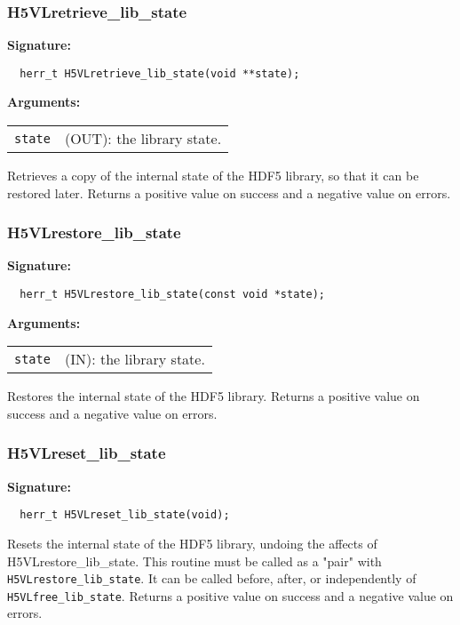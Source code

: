 \subsubsection{H5VLretrieve\_lib\_state}
\begin{mdframed}[style=bgbox]
\textbf{Signature:}
\begin{lstlisting}
  herr_t H5VLretrieve_lib_state(void **state);
\end{lstlisting}
\textbf{Arguments:}\\
\begin{tabular}{l p{13.5cm}}
 {\tt state} & (OUT): the library state.\\
\end{tabular}
\end{mdframed}
Retrieves a copy of the internal state of the HDF5 library,
so that it can be restored later.
Returns a positive value on success and a negative value on errors.
\bigskip


\subsubsection{H5VLrestore\_lib\_state}
\begin{mdframed}[style=bgbox]
\textbf{Signature:}
\begin{lstlisting}
  herr_t H5VLrestore_lib_state(const void *state);
\end{lstlisting}
\textbf{Arguments:}\\
\begin{tabular}{l p{13.5cm}}
 {\tt state} & (IN): the library state.\\
\end{tabular}
\end{mdframed}
Restores the internal state of the HDF5 library.
Returns a positive value on success and a negative value on errors.
\bigskip


\subsubsection{H5VLreset\_lib\_state}
\begin{mdframed}[style=bgbox]
\textbf{Signature:}
\begin{lstlisting}
  herr_t H5VLreset_lib_state(void);
\end{lstlisting}
\end{mdframed}
Resets the internal state of the HDF5 library, undoing the
affects of H5VLrestore\_lib\_state.
This routine must be called as a "pair" with
{\tt H5VLrestore\_lib\_state}.  It can be called before, after, or
independently of {\tt H5VLfree\_lib\_state}.
Returns a positive value on success and a negative value on errors.
\bigskip


